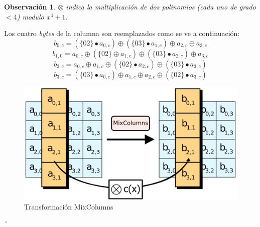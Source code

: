 \documentclass[peerreview]{IEEEtran}
\newtheorem{obs}{\textbf{Observación}}
\begin{document}
\begin{obs}
	 $\otimes$ indica la multiplicación de dos polinomios (cada uno de grado $< 4$) modulo $x^4 +1$.\\
	 \label{obs1}
\end{obs}


Los cuatro \textit{bytes} de la columna son reemplazados como se ve a
continuación:
$$b_{0, c}=(\{02\}\bullet a_{0, c})\oplus(\{03\}\bullet a_{1, c})\oplus a_{2,
      c}\oplus a_{3, c}$$
$$b_{1, 0}=a_{0, c}\oplus (\{02\}\oplus a_{1, c})\oplus(\{03\}\bullet a_{2,
    c})\oplus a_{3, c}$$
$$b_{2, c}= a_{0, c} \oplus a_{1, c} \oplus (\{02\}\bullet a_{2, c})\oplus
  (\{03\} \bullet a_{3, c})$$
$$b_{3, c}= (\{03 \}\bullet a_{0, c}) \oplus a_{1, c}\oplus a_{2, c} \oplus
  (\{02\}\bullet a_{3, c})$$

\begin{figure}[h]
  \includegraphics[scale=0.1]{figuras/MixColumns.png}
  \centering
  \caption{Transformación MixColumns}
  \label{fig: 5}
\end{figure}´
\end{document}
